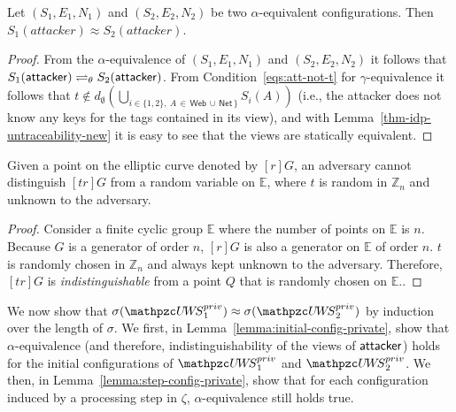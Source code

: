   \begin{lemma}
    Let $(S_1,E_1,N_1)$ and $(S_2,E_2,N_2)$ be two 
    $\alpha$-equivalent configurations. 
    Then $S_1(attacker)\approx S_2(attacker)$.
  \end{lemma}
  \begin{proof}
    From the $\alpha$-equivalence of $(S_1,E_1,N_1)$ and 
    $(S_2,E_2,N_2)$ it follows that $S_1(\mathsf{attacker}) 
    \rightleftharpoons_{\theta} S_2(\mathsf{attacker})$.
    From Condition~\ref{eqs:att-not-t} for $\gamma$-equivalence 
    it follows that
    $t \not\in d_\emptyset(\bigcup_{i \in \{1,2\},\ A\, \in\, 
    \mathsf{Web}\, \cup \, \mathsf{Net}\, \}}S_i(A))$
    (i.e., the attacker does not know any keys for the tags 
    contained in its view), and with Lemma~\ref{thm-idp-untraceability-new} it is easy to see 
    that the views are statically equivalent.
  \end{proof}

  \newc
  \begin{lemma}\label{thm-idp-untraceability-new}
    Given a point on the elliptic curve denoted by $[r]G$, 
    an adversary cannot distinguish $[tr]G$ from a random variable on $\mathbb{E}$, 
    where $t$ is random in $\mathbb{Z}_n$ and unknown to the adversary.
  \end{lemma}
  \begin{proof}
    Consider a finite cyclic group $\mathbb{E}$ where the number of points on $\mathbb{E}$ is $n$. 
    Because $G$ is a generator of order $n$, $[r]G$ is also a generator on $\mathbb{E}$ of order $n$. 
    $t$ is randomly chosen in $\mathbb{Z}_n$ and always kept unknown to the adversary. 
    Therefore, $[tr]G$ is \emph{indistinguishable} from a point $Q$ that is randomly chosen on $\mathbb{E}$.\cite{oprf-proved,voprf-proved}.
  \end{proof}
  \oldc
  
  We now show that $\sigma(\uppressoprivwebsystem_1) \approx
  \sigma(\uppressoprivwebsystem_2)$ by induction over the length 
  of $\sigma$. We first, in Lemma~\ref{lemma:initial-config-private}, 
  show that $\alpha$-equivalence (and therefore, indistinguishability 
  of the views of $\mathsf{attacker}$) holds for the initial 
  configurations of $\uppressoprivwebsystem_1$ and 
  $\uppressoprivwebsystem_2$. We then, in 
  Lemma~\ref{lemma:step-config-private}, show that for each 
  configuration induced by a processing step in $\zeta$,
  $\alpha$-equivalence still holds true.
  
